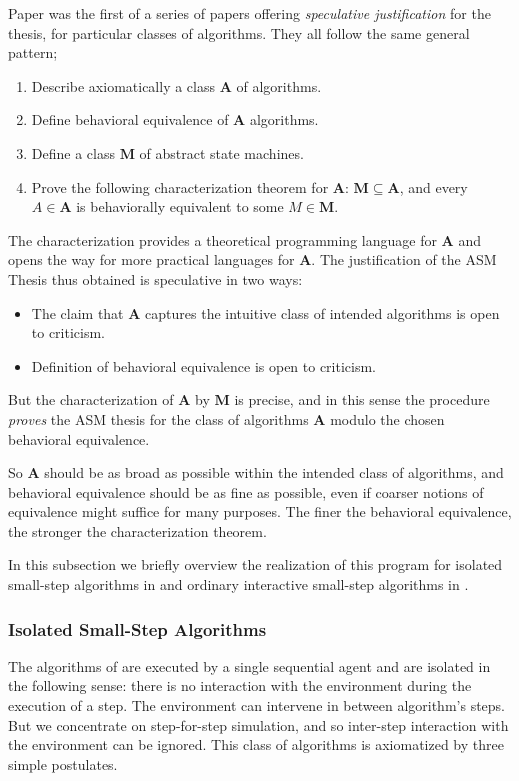 \documentclass{LMCS}
\theoremstyle{definition}
\newcommand{\bld}[1]{\ensuremath{\mathbf {#1}}}
\begin{document}
Paper \cite{seqth} was the first of a series of papers offering
\emph{speculative justification} for the thesis, for particular
classes of algorithms. They all follow the same general pattern;
\begin{enumerate}
\item Describe axiomatically a class \bld{A} of algorithms.
\item Define behavioral equivalence of \bld{A} algorithms.
\item Define a class \bld{M} of abstract state machines.
\item Prove the following characterization theorem for \bld{A}:
$\bld{M} \subseteq \bld{A}$, and every $A \in \bld{A}$ is
behaviorally equivalent to some $M \in \bld{M}$.
\end{enumerate}
The characterization provides a theoretical programming language for
\bld{A} and opens the way for more practical languages for
\bld{A}. The justification of the ASM Thesis thus obtained is speculative
in two ways:
\begin{itemize}
\item The claim that \bld{A} captures the intuitive class of intended
algorithms is open to criticism.
\item Definition of behavioral equivalence is open to criticism.
\end{itemize}
But the characterization of \bld{A} by \bld{M} is precise, and in this
sense the procedure \emph{proves} the ASM thesis for the class of
algorithms \bld{A} modulo the chosen behavioral equivalence.

So \bld{A} should be as broad as possible within the intended class of
algorithms, and behavioral equivalence should be as fine as possible, even
if coarser notions of equivalence might suffice for many purposes.  The
finer the behavioral equivalence, the stronger the characterization
theorem.

In this subsection we briefly overview the realization of this program
for isolated small-step algorithms in \cite{seqth} and ordinary
interactive small-step algorithms in \cite{oa1,oa2,oa3}.

\subsubsection{Isolated Small-Step
Algorithms}\label{sec:overview:seqth}

The algorithms of \cite{seqth} are executed by a single sequential agent
and are isolated in the following sense: there is no interaction with the
environment during the execution of a step.  The environment can intervene
in between algorithm's steps.  But we concentrate on step-for-step
simulation, and so inter-step interaction with the environment can be
ignored.  This class of algorithms is axiomatized by three simple
postulates.
\end{document}
